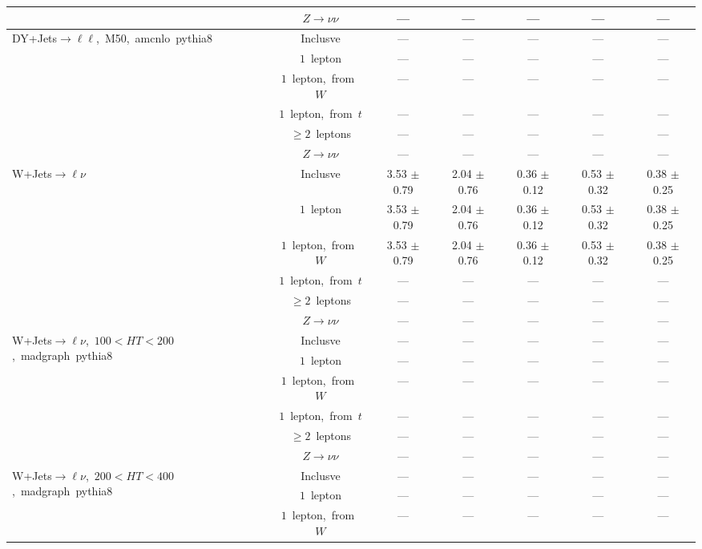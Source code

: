 \documentclass{article}
\begin{document}
\begin{longtable}{|l|c|c|c|c|c|c|}
 & $Z\rightarrow\nu\nu$  & ---  & ---  & ---  & ---  & --- \\* 
\hline 
\multirow{6}{*}{DY+Jets$\rightarrow\ell\ell$,~M50,~amcnlo~pythia8} & Inclusve  & ---  & ---  & ---  & ---  & --- \\* 
 & $1$~lepton  & ---  & ---  & ---  & ---  & --- \\* 
 & $1$~lepton,~from~$W$  & ---  & ---  & ---  & ---  & --- \\* 
 & $1$~lepton,~from~$t$  & ---  & ---  & ---  & ---  & --- \\* 
 & $\ge2$~leptons  & ---  & ---  & ---  & ---  & --- \\* 
 & $Z\rightarrow\nu\nu$  & ---  & ---  & ---  & ---  & --- \\* 
\hline 
\multirow{6}{*}{W+Jets$\rightarrow\ell\nu$} & Inclusve  & 3.53 $\pm$ 0.79  & 2.04 $\pm$ 0.76  & 0.36 $\pm$ 0.12  & 0.53 $\pm$ 0.32  & 0.38 $\pm$ 0.25 \\* 
 & $1$~lepton  & 3.53 $\pm$ 0.79  & 2.04 $\pm$ 0.76  & 0.36 $\pm$ 0.12  & 0.53 $\pm$ 0.32  & 0.38 $\pm$ 0.25 \\* 
 & $1$~lepton,~from~$W$  & 3.53 $\pm$ 0.79  & 2.04 $\pm$ 0.76  & 0.36 $\pm$ 0.12  & 0.53 $\pm$ 0.32  & 0.38 $\pm$ 0.25 \\* 
 & $1$~lepton,~from~$t$  & ---  & ---  & ---  & ---  & --- \\* 
 & $\ge2$~leptons  & ---  & ---  & ---  & ---  & --- \\* 
 & $Z\rightarrow\nu\nu$  & ---  & ---  & ---  & ---  & --- \\* 
\hline 
\multirow{6}{*}{W+Jets$\rightarrow\ell\nu$,~$100<HT<200$,~madgraph~pythia8} & Inclusve  & ---  & ---  & ---  & ---  & --- \\* 
 & $1$~lepton  & ---  & ---  & ---  & ---  & --- \\* 
 & $1$~lepton,~from~$W$  & ---  & ---  & ---  & ---  & --- \\* 
 & $1$~lepton,~from~$t$  & ---  & ---  & ---  & ---  & --- \\* 
 & $\ge2$~leptons  & ---  & ---  & ---  & ---  & --- \\* 
 & $Z\rightarrow\nu\nu$  & ---  & ---  & ---  & ---  & --- \\* 
\hline 
\multirow{6}{*}{W+Jets$\rightarrow\ell\nu$,~$200<HT<400$,~madgraph~pythia8} & Inclusve  & ---  & ---  & ---  & ---  & --- \\* 
 & $1$~lepton  & ---  & ---  & ---  & ---  & --- \\* 
 & $1$~lepton,~from~$W$  & ---  & ---  & ---  & ---  & --- \\* 

\end{longtable}
\end{document}

